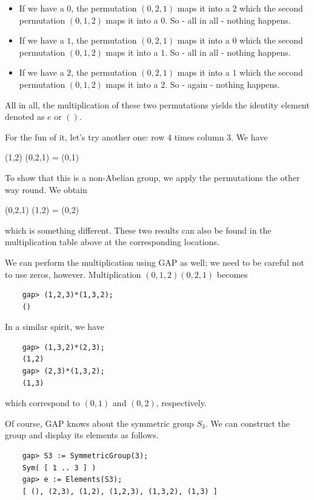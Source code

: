 \begin{itemize}
    \item If we have a $0$, the permutation $(0,2,1)$ maps it into a $2$ which the second permutation $(0,1,2)$ maps it into a $0$. So - all in all - nothing happens.
    \item If we have a $1$, the permutation $(0,2,1)$ maps it into a $0$ which the second permutation $(0,1,2)$ maps it into a $1$. So - all in all - nothing happens.
    \item If we have a $2$, the permutation $(0,2,1)$ maps it into a $1$ which the second permutation $(0,1,2)$ maps it into a $2$. So - again - nothing happens.
\end{itemize}

All in all, the multiplication of these two permutations yields the identity element denoted as $e$ or $()$.

For the fun of it, let's try another one: row $4$ times column $3$. We have

\bee
(1,2) (0,2,1) = (0,1)
\eee

To show that this is a non-Abelian group, we apply the permutations the other way round. We obtain

\bee
(0,2,1) (1,2) = (0,2)
\eee

which is something different. These two results can also be found in the multiplication table above at the corresponding locations.

We can perform the multiplication using GAP as well; we need to be careful not to use zeros, however. Multiplication $(0,1,2)(0,2,1)$ becomes

\begin{verbatim}
    gap> (1,2,3)*(1,3,2);
    ()
\end{verbatim}

In a similar spirit, we have

\begin{verbatim}
    gap> (1,3,2)*(2,3);
    (1,2)
    gap> (2,3)*(1,3,2);
    (1,3)
\end{verbatim}

which correspond to $(0,1)$ and $(0,2)$, respectively.

Of course, GAP knows about the symmetric group $S_3$. We can construct the group and display its elements as follows.

\begin{verbatim}
    gap> S3 := SymmetricGroup(3);
    Sym( [ 1 .. 3 ] )
    gap> e := Elements(S3);
    [ (), (2,3), (1,2), (1,2,3), (1,3,2), (1,3) ]
\end{verbatim}


